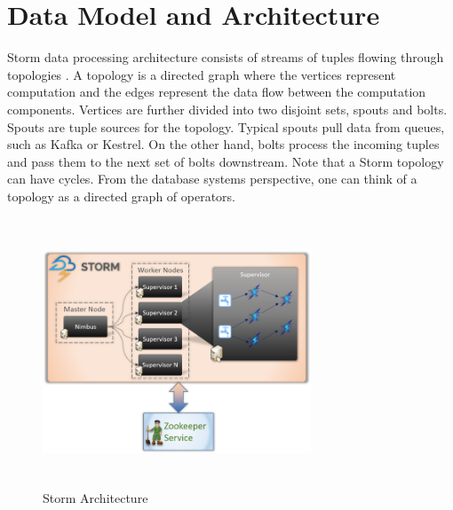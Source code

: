 \documentclass[9pt,twocolumn,twoside]{../../styles/osajnl}
\begin{document}
\section{Data Model and Architecture}
Storm data processing architecture consists of streams of tuples
flowing through topologies \cite{storm} . A topology is a directed
graph where the vertices represent computation and the edges represent
the data flow between the computation components. Vertices are further
divided into two disjoint sets, spouts and bolts. Spouts are tuple
sources for the topology.  Typical spouts pull data from queues, such
as Kafka \cite{kafka} or Kestrel. On the other hand, bolts process the
incoming tuples and pass them to the next set of bolts downstream.
Note that a Storm topology can have cycles. From the database systems
perspective, one can think of a topology as a directed graph of
operators.

\begin{figure}
  \includegraphics[width=8cm,height=8cm,keepaspectratio,width=\linewidth]{images/apache-storm.png}
  \caption{Storm Architecture}
  \label{Storm Architecture}
\end{figure}
\end{document}
